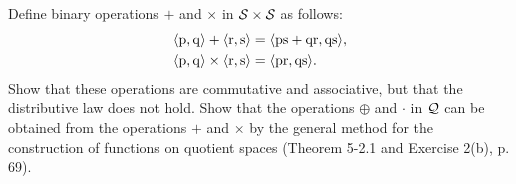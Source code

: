 \begin{exercise}
Define binary operations $+$ and $\times$ in $\mathcal{S}\times\mathcal{S}$ as follows:
\begin{align*}
    \aprn{\mrm p, \mrm q} + \aprn{\mrm r,\mrm s} &= \aprn{\mrm{ps+qr}, \mrm{qs}},\\
    \aprn{\mrm p, \mrm q}\times\aprn{\mrm r,\mrm s} &= \aprn{\mrm{pr},\mrm{qs}}.
\end{align*}
Show that these operations are commutative and associative, but that the distributive
law does not hold. Show that the operations $\oplus$ and $\cdot$ in $\mathcal{Q}$ can be obtained from the
operations $+$ and $\times$ by the general method for the construction of functions on quotient spaces
(Theorem 5-2.1 and Exercise 2(b), p. 69).
\end{exercise}

